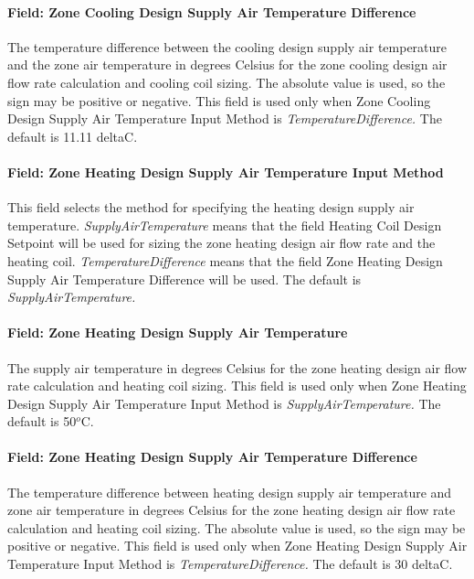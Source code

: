 \paragraph{Field: Zone Cooling Design Supply Air Temperature Difference}\label{field-zone-cooling-design-supply-air-temperature-difference-1}

The temperature difference between the cooling design supply air temperature and the zone air temperature in degrees Celsius for the zone cooling design air flow rate calculation and cooling coil sizing. The absolute value is used, so the sign may be positive or negative. This field is used only when Zone Cooling Design Supply Air Temperature Input Method is \emph{TemperatureDifference.} The default is 11.11 deltaC.

\paragraph{Field: Zone Heating Design Supply Air Temperature Input Method}\label{field-zone-heating-design-supply-air-temperature-input-method-1}

This field selects the method for specifying the heating design supply air temperature. \emph{SupplyAirTemperature} means that the field Heating Coil Design Setpoint will be used for sizing the zone heating design air flow rate and the heating coil. \emph{TemperatureDifference} means that the field Zone Heating Design Supply Air Temperature Difference will be used. The default is \emph{SupplyAirTemperature.}

\paragraph{Field: Zone Heating Design Supply Air Temperature}\label{field-zone-heating-design-supply-air-temperature-000}

The supply air temperature in degrees Celsius for the zone heating design air flow rate calculation and heating coil sizing. This field is used only when Zone Heating Design Supply Air Temperature Input Method is \emph{SupplyAirTemperature.} The default is 50\(^{o}\)C.

\paragraph{Field: Zone Heating Design Supply Air Temperature Difference}\label{field-zone-heating-design-supply-air-temperature-difference-1}

The temperature difference between heating design supply air temperature and zone air temperature in degrees Celsius for the zone heating design air flow rate calculation and heating coil sizing. The absolute value is used, so the sign may be positive or negative. This field is used only when Zone Heating Design Supply Air Temperature Input Method is \emph{TemperatureDifference.} The default is 30 deltaC.

